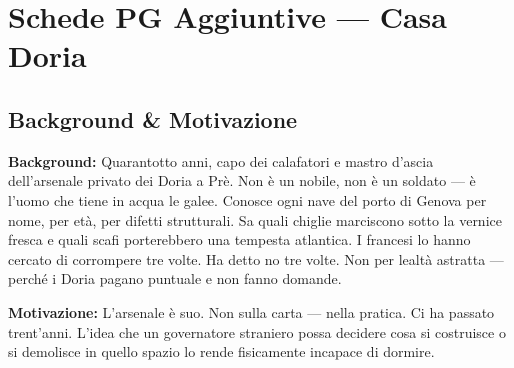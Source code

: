 
\chapter{Schede PG Aggiuntive --- Casa Doria}



\section*{Background \& Motivazione}

\begin{rulebox}{}
  \textbf{Background:} Quarantotto anni, capo dei calafatori e mastro d'ascia
  dell'arsenale privato dei Doria a Prè. Non è un nobile, non è un soldato —
  è l'uomo che tiene in acqua le galee. Conosce ogni nave del porto di Genova
  per nome, per età, per difetti strutturali. Sa quali chiglie marciscono sotto
  la vernice fresca e quali scafi porterebbero una tempesta atlantica.
  I francesi lo hanno cercato di corrompere tre volte. Ha detto no tre volte.
  Non per lealtà astratta — perché i Doria pagano puntuale e non fanno domande.

  \medskip\noindent\textcolor{DoriaBlue}{\textbf{Motivazione:}} L'arsenale è suo.
  Non sulla carta — nella pratica. Ci ha passato trent'anni. L'idea che un
  governatore straniero possa decidere cosa si costruisce o si demolisce in
  quello spazio lo rende fisicamente incapace di dormire.
\end{rulebox}

